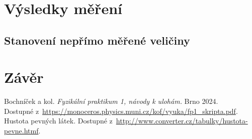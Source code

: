 \documentclass[a4paper,11pt]{article}
\begin{document}
\section{Výsledky měření}

\subsection{Stanovení nepřímo měřené veličiny}

\section{Závěr}


\begin{thebibliography}{0}
 Bochníček a kol. \textit{Fyzikální praktikum 1, návody k ulohám.} Brno 2024.\\ Dostupné z~\url{https://monoceros.physics.muni.cz/kof/vyuka/fp1_skripta.pdf}.   
 Hustota pevných látek. Dostupné z~\url{http://www.converter.cz/tabulky/hustota-pevne.htmf}.   
\end{thebibliography}
\end{document}
